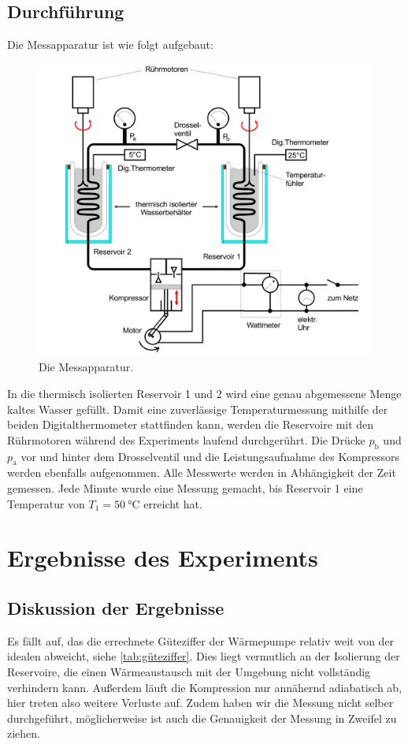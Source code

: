 \documentclass{scrartcl} %
\begin{document}
    \subsection{Durchführung}
      Die Messapparatur ist wie folgt aufgebaut:
      \begin{figure}
        \centering
        \includegraphics[scale = 0.15]{AufbauMessreihe.png}
        \caption{Die Messapparatur.}
        \label{fig:wärmepumpe2}
      \end{figure}
      In die thermisch isolierten Reservoir 1 und 2 wird eine genau abgemessene Menge kaltes Wasser gefüllt. Damit eine zuverlässige Temperaturmessung mithilfe der beiden
      Digitalthermometer stattfinden kann, werden die Reservoire mit den Rührmotoren während des Experiments laufend durchgerührt. Die Drücke $p_\text{b}$ und $p_\text{a}$
      vor und hinter dem Drosselventil und die Leistungsaufnahme des Kompressors werden ebenfalls aufgenommen. Alle Messwerte werden in Abhängigkeit der Zeit gemessen.
      Jede Minute wurde eine Messung gemacht, bis Reservoir 1 eine Temperatur von $T_\text{1} = \SI{50}{\celsius}$ erreicht hat.
\section{Ergebnisse des Experiments}
    \subsection{Diskussion der Ergebnisse}
    Es fällt auf, das die errechnete Güteziffer der Wärmepumpe relativ weit von der idealen abweicht, siehe \ref{tab:güteziffer}. Dies liegt vermutlich an der Isolierung der
    Reservoire, die einen Wärmeaustausch mit der Umgebung nicht vollständig verhindern kann. Außerdem läuft die Kompression nur annähernd adiabatisch ab, hier treten also weitere
    Verluste auf. Zudem haben wir die Messung nicht selber durchgeführt, möglicherweise ist auch die Genauigkeit der Messung in Zweifel zu ziehen.
\end{document}
